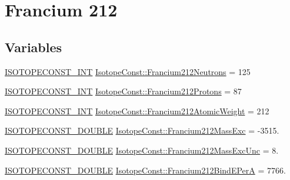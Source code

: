 \hypertarget{group___isotope_const-_francium-_fr212}{}\section{Francium 212}
\label{group___isotope_const-_francium-_fr212}
\subsection*{Variables}
\begin{DoxyCompactItemize}
\item 
\mbox{\hyperlink{group___isotope_const-_macros_ga5f18360b3e99483a35c32d789e62621c}{I\+S\+O\+T\+O\+P\+E\+C\+O\+N\+S\+T\+\_\+\+I\+NT}} \mbox{\hyperlink{group___isotope_const-_francium-_fr212_ga85841c49ffc0382fd9d0167c0ef9e8fc}{Isotope\+Const\+::\+Francium212\+Neutrons}} = 125
\item 
\mbox{\hyperlink{group___isotope_const-_macros_ga5f18360b3e99483a35c32d789e62621c}{I\+S\+O\+T\+O\+P\+E\+C\+O\+N\+S\+T\+\_\+\+I\+NT}} \mbox{\hyperlink{group___isotope_const-_francium-_fr212_ga81ef79cf25d64c384a05f6aa7fc1247e}{Isotope\+Const\+::\+Francium212\+Protons}} = 87
\item 
\mbox{\hyperlink{group___isotope_const-_macros_ga5f18360b3e99483a35c32d789e62621c}{I\+S\+O\+T\+O\+P\+E\+C\+O\+N\+S\+T\+\_\+\+I\+NT}} \mbox{\hyperlink{group___isotope_const-_francium-_fr212_ga81e478bdfaffb20773afdac191747f5a}{Isotope\+Const\+::\+Francium212\+Atomic\+Weight}} = 212
\item 
\mbox{\hyperlink{group___isotope_const-_macros_ga8f45a7272ce02c0b4c65c44636ed719a}{I\+S\+O\+T\+O\+P\+E\+C\+O\+N\+S\+T\+\_\+\+D\+O\+U\+B\+LE}} \mbox{\hyperlink{group___isotope_const-_francium-_fr212_ga1557175c6ee512a4e5bff0448c81dc8a}{Isotope\+Const\+::\+Francium212\+Mass\+Exc}} = -\/3515.
\item 
\mbox{\hyperlink{group___isotope_const-_macros_ga8f45a7272ce02c0b4c65c44636ed719a}{I\+S\+O\+T\+O\+P\+E\+C\+O\+N\+S\+T\+\_\+\+D\+O\+U\+B\+LE}} \mbox{\hyperlink{group___isotope_const-_francium-_fr212_gadaca974267dd3847c52b96cb17ce1cc7}{Isotope\+Const\+::\+Francium212\+Mass\+Exc\+Unc}} = 8.
\item 
\mbox{\hyperlink{group___isotope_const-_macros_ga8f45a7272ce02c0b4c65c44636ed719a}{I\+S\+O\+T\+O\+P\+E\+C\+O\+N\+S\+T\+\_\+\+D\+O\+U\+B\+LE}} \mbox{\hyperlink{group___isotope_const-_francium-_fr212_ga8dded2c4f76d833acee97784fa3e36f9}{Isotope\+Const\+::\+Francium212\+Bind\+E\+PerA}} = 7766.
\item 

\end{DoxyCompactItemize}
